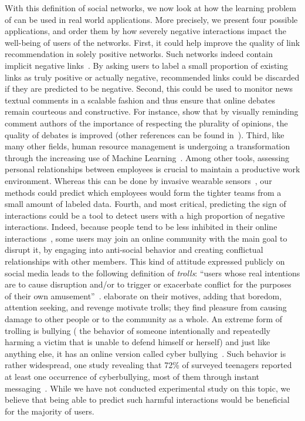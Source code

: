 \bigskip

With this definition of social networks, we now look at how the learning problem of \esp{} can be
used in real world applications. More precisely, we present four possible applications, and order
them by how severely negative interactions impact the well-being of users of the networks.
First, it could help improve the quality of link recommendation in solely positive networks. Such
networks indeed contain implicit negative links~\autocite{Yang2012}. By asking users to label a
small proportion of existing links as truly positive or actually negative, recommended links could
be discarded if they are predicted to be negative.
%
Second, this could be used to monitor news textual comments in a scalable fashion and thus ensure
that online debates remain courteous and constructive. For instance, \textcite{betterDebate14} show
that by visually reminding comment authors of the importance of respecting the plurality of
opinions, the quality of debates is improved (other references can be found
in~\autocite{journalism15}).
%
Third, like many other fields, human resource management is undergoing a transformation through the
increasing use of Machine Learning~\autocite{MLinHR16}. Among other tools, assessing personal
relationships between employees is crucial to maintain a productive work environment. Whereas this
can be done by invasive wearable sensors~\autocite{WearableBehavior09}, our methods could predict
which employees would form the tighter teams from a small amount of labeled data.
%
Fourth, and most critical, predicting the sign of interactions could be a tool to detect users with
a high proportion of negative interactions. Indeed, because people tend to be less inhibited in
their online interactions~\cite{Suler04}, some users may join an online community with the main goal
to disrupt it, by engaging into anti-social behavior and creating conflictual relationships with
other members. This kind of attitude expressed publicly on social media leads to the following
definition of \emph{trolls}: \enquote{users whose real intentions are to cause disruption and/or to
trigger or exacerbate conflict for the purposes of their own amusement}~\autocite{Hardaker10}.
\Textcite{Shachaf10} elaborate on their motives, adding that boredom, attention seeking, and
revenge motivate trolls; they find pleasure from causing damage to other people or to the community
as a whole. An extreme form of trolling is bullying (\ie{} the behavior of someone intentionally and
repeatedly harming a victim that is unable to defend himself or herself) and just like anything
else, it has an online version called cyber bullying~\autocite{cyberbullying13}. Such behavior is
rather widespread, one study revealing that 72\% of  surveyed teenagers reported at least
one occurrence of cyberbullying, most of them through instant messaging~\autocite{Juvonen08}. While
we have not conducted experimental study on this topic, we believe that being able to predict such
harmful interactions would be beneficial for the majority of users.

